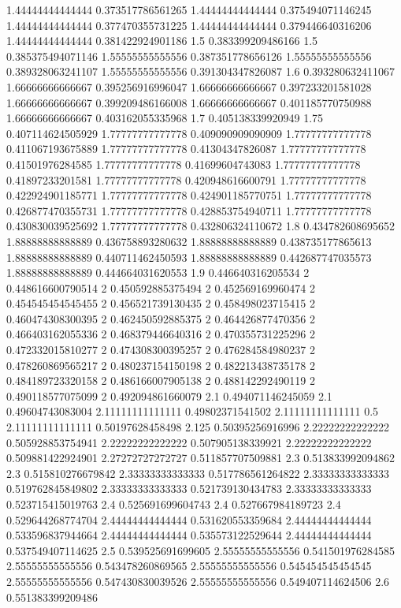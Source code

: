 {1.44444444444444 0.373517786561265
1.44444444444444 0.375494071146245
1.44444444444444 0.377470355731225
1.44444444444444 0.379446640316206
1.44444444444444 0.381422924901186
1.5 0.383399209486166
1.5 0.385375494071146
1.55555555555556 0.387351778656126
1.55555555555556 0.389328063241107
1.55555555555556 0.391304347826087
1.6 0.393280632411067
1.66666666666667 0.395256916996047
1.66666666666667 0.397233201581028
1.66666666666667 0.399209486166008
1.66666666666667 0.401185770750988
1.66666666666667 0.403162055335968
1.7 0.405138339920949
1.75 0.407114624505929
1.77777777777778 0.409090909090909
1.77777777777778 0.411067193675889
1.77777777777778 0.41304347826087
1.77777777777778 0.41501976284585
1.77777777777778 0.41699604743083
1.77777777777778 0.41897233201581
1.77777777777778 0.420948616600791
1.77777777777778 0.422924901185771
1.77777777777778 0.424901185770751
1.77777777777778 0.426877470355731
1.77777777777778 0.428853754940711
1.77777777777778 0.430830039525692
1.77777777777778 0.432806324110672
1.8 0.434782608695652
1.88888888888889 0.436758893280632
1.88888888888889 0.438735177865613
1.88888888888889 0.440711462450593
1.88888888888889 0.442687747035573
1.88888888888889 0.444664031620553
1.9 0.446640316205534
2 0.448616600790514
2 0.450592885375494
2 0.452569169960474
2 0.454545454545455
2 0.456521739130435
2 0.458498023715415
2 0.460474308300395
2 0.462450592885375
2 0.464426877470356
2 0.466403162055336
2 0.468379446640316
2 0.470355731225296
2 0.472332015810277
2 0.474308300395257
2 0.476284584980237
2 0.478260869565217
2 0.480237154150198
2 0.482213438735178
2 0.484189723320158
2 0.486166007905138
2 0.488142292490119
2 0.490118577075099
2 0.492094861660079
2.1 0.494071146245059
2.1 0.49604743083004
2.11111111111111 0.49802371541502
2.11111111111111 0.5
2.11111111111111 0.50197628458498
2.125 0.50395256916996
2.22222222222222 0.505928853754941
2.22222222222222 0.507905138339921
2.22222222222222 0.509881422924901
2.27272727272727 0.511857707509881
2.3 0.513833992094862
2.3 0.515810276679842
2.33333333333333 0.517786561264822
2.33333333333333 0.519762845849802
2.33333333333333 0.521739130434783
2.33333333333333 0.523715415019763
2.4 0.525691699604743
2.4 0.527667984189723
2.4 0.529644268774704
2.44444444444444 0.531620553359684
2.44444444444444 0.533596837944664
2.44444444444444 0.535573122529644
2.44444444444444 0.537549407114625
2.5 0.539525691699605
2.55555555555556 0.541501976284585
2.55555555555556 0.543478260869565
2.55555555555556 0.545454545454545
2.55555555555556 0.547430830039526
2.55555555555556 0.549407114624506
2.6 0.551383399209486
}
